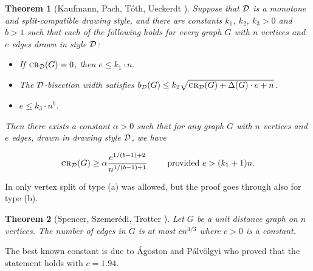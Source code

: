 \documentclass[a4paper,10pt]{article}
\newtheorem{theorem}{Theorem}
\def\cro{{\mbox {\sc cr}}}
\begin{document}
\begin{theorem} [Kaufmann, Pach, T\'oth, Ueckerdt \cite{KPTU21}] \label{Kaufmann-Pach-Toth-Ueckerdt}
Suppose that $\cal D$ is a monotone and split-compatible drawing style, and there are constants $k_1$, $k_2$, $k_3 >0$ and
$b > 1$ such that each of the following holds for every graph $G$ with $n$ vertices and $e$ edges drawn in style $\cal D$:
\begin{itemize}
\item[1.]  If ${\cro}_{\cal D}(G) = 0$, then $e \leq k_1 \cdot n$.
\item[2.] The $\cal D$-bisection width satisfies 
$b_{\cal D}(G) \leq k_2 \sqrt{{\cro}_{\cal D}(G) + \Delta(G) \cdot e + n}$.
\item[3.] $e \leq k_3 \cdot n^b$.
\end{itemize}

Then there exists a 
constant $\alpha > 0$ such that for any graph $G$ with $n$ vertices and $e$ edges, drawn in drawing style $\cal D$, we have

$${\cro}_{\cal D}(G) \geq\alpha\frac{e^{1/(b-1)+2}}{n^{1/(b-1)+1}} \text{ \qquad provided } e > (k_1 + 1)n. $$
\end{theorem}

In \cite{KPTU21} only vertex split of type (a) was allowed, but the proof goes through also for type (b).

\begin{theorem} [Spencer, Szemer\'edi, Trotter \cite{SST84}]
    Let $G$ be a unit distance graph on $n$ vertices. The number of edges in $G$ is at most $c n^{4/3}$ where $c>0$ is a constant.
\end{theorem}

The best known constant is due to \'Agoston and P\'alv\"olgyi \cite{AP22} who proved that the statement holds with $c=1.94$.

\smallskip
\end{document}
